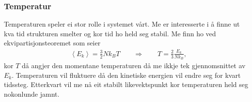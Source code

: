 \documentclass[12pt, a4paper]{article}
\theoremstyle{definition} \newtheorem*{definition}{Teorem}
\begin{document}
        \subsubsection*{Temperatur}
            Temperaturen speler ei stor rolle i systemet vårt. Me er interesserte i å finne ut kva tid strukturen smelter og kor tid ho held seg stabil. Me finn ho 
            ved ekvipartisjonsteoremet som seier
            \begin{align*}
                &\left \langle E_{k} \right \rangle = \frac{3}{2} Nk_{B}T \qquad \Rightarrow \qquad T = \frac{2}{3}\frac{E_{k}}{Nk_{B}},
            \end{align*}
            kor $T$ då angjer den momentane temperaturen då me ikkje tek gjennomsnittet av $E_{k}$. Temperaturen vil fluktuere då den kinetiske energien vil endre seg for
            kvart tidssteg. Etterkvart vil me nå eit stabilt likevektspunkt kor temperaturen held seg nokonlunde jamnt.
\end{document}
